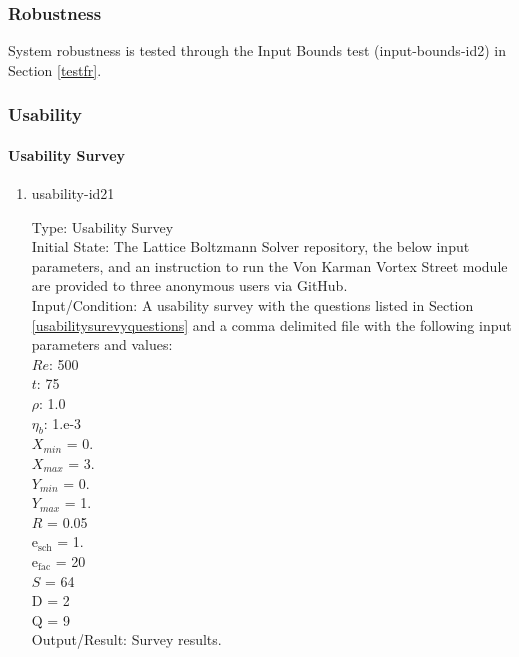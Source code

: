 \documentclass[12pt, titlepage]{article}
\newcommand{\myprogname}{Lattice Boltzmann Solver}
\begin{document}
\subsubsection{Robustness}
		
System robustness is tested through the Input Bounds test (input-bounds-id2) in Section \ref{testfr}.

\subsubsection{Usability}

\paragraph{Usability Survey}

\begin{enumerate}

\item{usability-id21\\}

Type: Usability Survey\\
					
Initial State: The {\myprogname} repository, the below input parameters, and an instruction to run the Von Karman Vortex Street module are provided to three anonymous users via GitHub.\\
					
Input/Condition: A usability survey with the questions listed in Section \ref{usabilitysurevyquestions} and a comma delimited file with the following input parameters and values:\\
$Re$: 500\\
$t$: 75\\
$\rho$: 1.0\\
$\eta_b$: 1.e-3\\
$X_{min}$ = 0.\\
$X_{max}$ = 3.\\
$Y_{min}$ = 0.\\
$Y_{max}$ = 1.\\
$R$ = 0.05\\
$\mathrm{e_{sch}}$ = 1.\\
$\mathrm{e_{fac}}$ = 20\\
$S$ = 64\\
$\mathrm{D}$ = 2\\
$\mathrm{Q}$ = 9\\

				
Output/Result: Survey results.\\


\end{enumerate}
\end{document}
